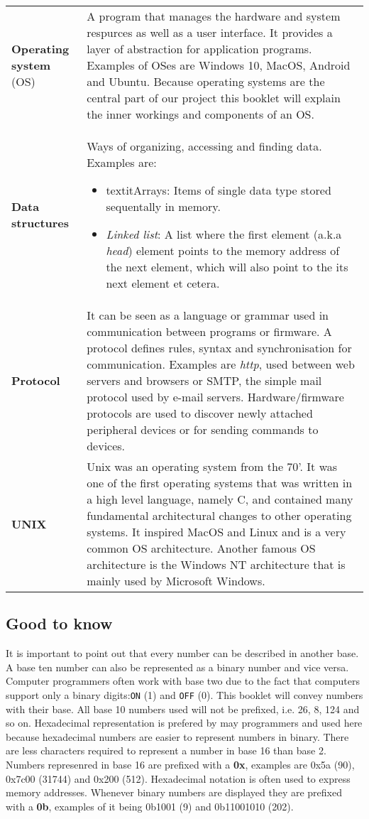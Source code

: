 \begin{tabular}{ | m{30mm} | m{120mm} |}
\textbf{Operating system} (OS) & A program that manages the hardware and system respurces as well as a user interface. It provides a layer of abstraction for application programs. Examples of OSes are Windows 10, MacOS, Android and Ubuntu. Because operating systems are the central part of our project this booklet will explain the inner workings and components of an OS. \\
\textbf{Data structures} & Ways of organizing, accessing and finding data. Examples are: \begin{itemize}
\item textit{Arrays}: Items of single data type stored sequentally in memory.
\item \textit{Linked list}: A list where the first element (a.k.a \textit{head}) element points to the memory address of the next element, which will also point to the its next element et cetera.
\end{itemize} \\
\textbf{Protocol} & It can be seen as a language or grammar used in communication between programs or firmware. A protocol defines rules, syntax and synchronisation for communication. Examples are \textit{http}, used between web servers and browsers or SMTP, the simple mail protocol used by e-mail servers. Hardware/firmware protocols are used to discover newly attached peripheral devices or for sending commands to devices. \\
\textbf{UNIX} & Unix was an operating system from the 70'. It was one of the first operating systems that was written in a high level language, namely C, and contained many fundamental architectural changes to other operating systems. It inspired MacOS and Linux and is a very common OS architecture. Another famous OS architecture is the Windows NT architecture that is mainly used by Microsoft Windows.
\end{tabular}


\subsection{Good to know}

It is important to point out that every number can be described in another base. A base ten number can also be represented
as a binary number and vice versa. Computer programmers often work with base two due to the fact that computers support only a
binary digits:\texttt{ON} (1) and \texttt{OFF} (0).
This booklet will convey numbers with their base. All base 10 numbers used will not be prefixed, i.e. 26, 8, 124 and so on.
Hexadecimal representation is prefered by may programmers and used here because hexadecimal numbers are easier to represent
numbers in binary. There are less characters required to represent a number in base 16 than base 2. Numbers represenred in
base 16 are prefixed with a \textbf{0x}, examples are 0x5a (90), 0x7c00 (31744) and 0x200 (512). Hexadecimal notation is often used to
express memory addresses. Whenever binary numbers are displayed they are prefixed with a \textbf{0b}, examples of it being 0b1001 (9)
and 0b11001010 (202).

